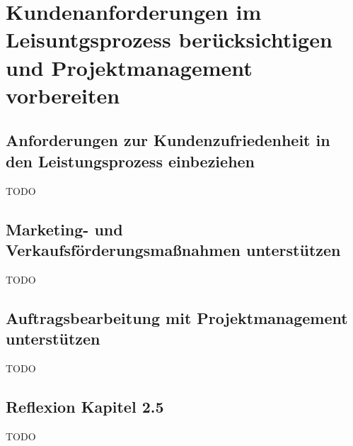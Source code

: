 \section{Kundenanforderungen im Leisuntgsprozess berücksichtigen und Projektmanagement vorbereiten}
\subsection{Anforderungen zur Kundenzufriedenheit in den Leistungsprozess einbeziehen}
    TODO
\subsection{Marketing- und Verkaufsförderungsmaßnahmen unterstützen}
    TODO
\subsection{Auftragsbearbeitung mit Projektmanagement unterstützen}
    TODO
\subsection*{Reflexion Kapitel 2.5}
    \begin{refindent}
        TODO
    \end{refindent}